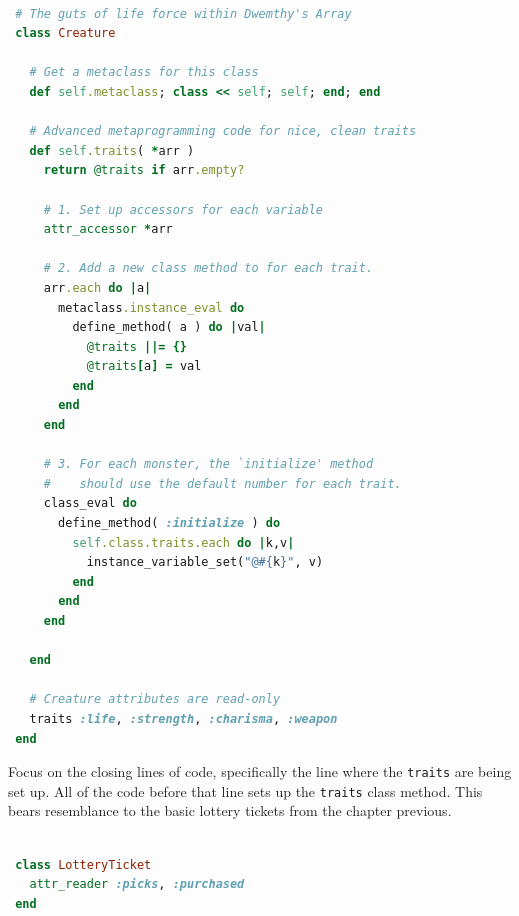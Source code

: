 \documentclass[10pt,twoside]{report}
\begin{document}
\begin{lstlisting}[basicstyle=\ttfamily\color{basiccolor},
    commentstyle = \ttfamily\color{commentcolor},
    keywordstyle=\ttfamily\color{keywordscolor},
    stringstyle=\color{stringcolor},
    language=Ruby,
    basicstyle=\small\ttfamily,
    showstringspaces=false,
  ]

 # The guts of life force within Dwemthy's Array
 class Creature

   # Get a metaclass for this class
   def self.metaclass; class << self; self; end; end

   # Advanced metaprogramming code for nice, clean traits
   def self.traits( *arr )
     return @traits if arr.empty?

     # 1. Set up accessors for each variable
     attr_accessor *arr

     # 2. Add a new class method to for each trait.
     arr.each do |a|
       metaclass.instance_eval do
         define_method( a ) do |val|
           @traits ||= {}
           @traits[a] = val
         end
       end
     end

     # 3. For each monster, the `initialize' method
     #    should use the default number for each trait.
     class_eval do
       define_method( :initialize ) do
         self.class.traits.each do |k,v|
           instance_variable_set("@#{k}", v)
         end
       end
     end

   end

   # Creature attributes are read-only
   traits :life, :strength, :charisma, :weapon
 end

\end{lstlisting}


Focus on the closing lines of code, specifically the line where the
\lstinline[breaklines=true]|traits| are being set up.  All of the code
before that line sets up the \lstinline[breaklines=true]|traits| class
method.  This bears resemblance to the basic lottery tickets from the
chapter previous.


\begin{lstlisting}[basicstyle=\ttfamily\color{basiccolor},
    commentstyle = \ttfamily\color{commentcolor},
    keywordstyle=\ttfamily\color{keywordscolor},
    stringstyle=\color{stringcolor},
    language=Ruby,
    basicstyle=\small\ttfamily,
    showstringspaces=false,
  ]

 class LotteryTicket
   attr_reader :picks, :purchased
 end

\end{lstlisting}
\end{document}
